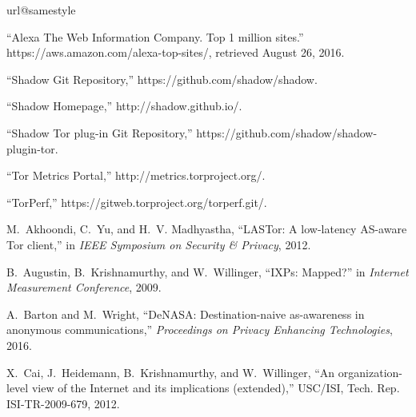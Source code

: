 \documentclass[conference]{styles/IEEEtran}
\begin{document}
\newcommand{\BIBdecl}{\setlength{\itemsep}{0\baselineskip plus 0.1\baselineskip minus 0.1\baselineskip}}
\balance
{\footnotesize 


\ifbbl \begin{thebibliography}{10}
\providecommand{\url}[1]{#1}
\csname url@samestyle\endcsname
\providecommand{\newblock}{\relax}
\providecommand{\bibinfo}[2]{#2}
\providecommand{\BIBentrySTDinterwordspacing}{\spaceskip=0pt\relax}
\providecommand{\BIBentryALTinterwordstretchfactor}{4}
\providecommand{\BIBentryALTinterwordspacing}{\spaceskip=\fontdimen2\font plus
\BIBentryALTinterwordstretchfactor\fontdimen3\font minus
  \fontdimen4\font\relax}
\providecommand{\BIBforeignlanguage}[2]{{\expandafter\ifx\csname l@#1\endcsname\relax
\typeout{** WARNING: IEEEtranS.bst: No hyphenation pattern has been}\typeout{** loaded for the language `#1'. Using the pattern for}\typeout{** the default language instead.}\else
\language=\csname l@#1\endcsname
\fi
#2}}
\providecommand{\BIBdecl}{\relax}
\BIBdecl

``{Alexa The Web Information Company. Top 1 million sites.}''
  \url{https://aws.amazon.com/alexa-top-sites/}, retrieved August 26, 2016.

``{Shadow Git Repository},'' \url{https://github.com/shadow/shadow}.

``{Shadow Homepage},'' \url{http://shadow.github.io/}.

``{Shadow Tor plug-in Git Repository},''
  \url{https://github.com/shadow/shadow-plugin-tor}.

``{Tor Metrics Portal},'' \url{http://metrics.torproject.org/}.

``{TorPerf},'' \url{https://gitweb.torproject.org/torperf.git/}.

M.~Akhoondi, C.~Yu, and H.~V. Madhyastha, ``{LASTor}: A low-latency {AS}-aware
  {Tor} client,'' in \emph{IEEE Symposium on Security \& Privacy}, 2012.

B.~Augustin, B.~Krishnamurthy, and W.~Willinger, ``{IXP}s: Mapped?'' in
  \emph{Internet Measurement Conference}, 2009.

A.~Barton and M.~Wright, ``{DeNASA}: Destination-naive as-awareness in
  anonymous communications,'' \emph{Proceedings on Privacy Enhancing
  Technologies}, 2016.

X.~Cai, J.~Heidemann, B.~Krishnamurthy, and W.~Willinger, ``An
  organization-level view of the {I}nternet and its implications (extended),''
  USC/ISI, Tech. Rep. ISI-TR-2009-679, 2012.


\end{thebibliography}}
\end{document}
